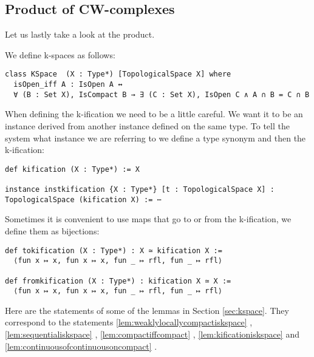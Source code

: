 \subsection{Product of CW-complexes}

Let us lastly take a look at the product. 

We define k-spaces as follows: 
\href{https://github.com/scholzhannah/CWComplexes/blob/7be4872a05b534011cc969eb5b80a4b7f0bf57e2/CWcomplexes/KSpace.lean#L33-L39}{\faExternalLink}

\begin{lstlisting}
class KSpace  (X : Type*) [TopologicalSpace X] where
  isOpen_iff A : IsOpen A ↔
  ∀ (B : Set X), IsCompact B → ∃ (C : Set X), IsOpen C ∧ A ∩ B = C ∩ B
\end{lstlisting}

When defining the k-ification we need to be a little careful. 
We want it to be an instance derived from another instance defined on the same type. 
To tell the system what instance we are referring to we define a type synonym and then the k-ification: 
\href{https://github.com/scholzhannah/CWComplexes/blob/7be4872a05b534011cc969eb5b80a4b7f0bf57e2/CWcomplexes/KSpace.lean#L119-L146}{\faExternalLink}

\begin{lstlisting}
def kification (X : Type*) := X

instance instkification {X : Type*} [t : TopologicalSpace X] : TopologicalSpace (kification X) := ⋯
\end{lstlisting}

Sometimes it is convenient to use maps that go to or from the k-ification, we define them as bijections:
\href{https://github.com/scholzhannah/CWComplexes/blob/7be4872a05b534011cc969eb5b80a4b7f0bf57e2/CWcomplexes/KSpace.lean#L164-L170}{\faExternalLink}

\begin{lstlisting}
def tokification (X : Type*) : X ≃ kification X :=
  ⟨fun x ↦ x, fun x ↦ x, fun _ ↦ rfl, fun _ ↦ rfl⟩
  
def fromkification (X : Type*) : kification X ≃ X :=
  ⟨fun x ↦ x, fun x ↦ x, fun _ ↦ rfl, fun _ ↦ rfl⟩
\end{lstlisting}

Here are the statements of some of the lemmas in Section \ref{sec:kspace}. 
They correspond to the statements \ref{lem:weaklylocallycompactiskspace}
\href{https://github.com/scholzhannah/CWComplexes/blob/7be4872a05b534011cc969eb5b80a4b7f0bf57e2/CWcomplexes/KSpace.lean#L69-L86}{\faExternalLink},
\ref{lem:sequentialiskspace}
\href{https://github.com/scholzhannah/CWComplexes/blob/7be4872a05b534011cc969eb5b80a4b7f0bf57e2/CWcomplexes/KSpace.lean#L88-L114}{\faExternalLink},
\ref{lem:compactiffcompact}
\href{https://github.com/scholzhannah/CWComplexes/blob/7be4872a05b534011cc969eb5b80a4b7f0bf57e2/CWcomplexes/KSpace.lean#L196-L236}{\faExternalLink},
\ref{lem:kificationiskspace}
\href{https://github.com/scholzhannah/CWComplexes/blob/7be4872a05b534011cc969eb5b80a4b7f0bf57e2/CWcomplexes/KSpace.lean#L245-L258}{\faExternalLink}
and \ref{lem:continuousofcontinuousoncompact}
\href{https://github.com/scholzhannah/CWComplexes/blob/7be4872a05b534011cc969eb5b80a4b7f0bf57e2/CWcomplexes/KSpace.lean#L303-L316}{\faExternalLink}.

